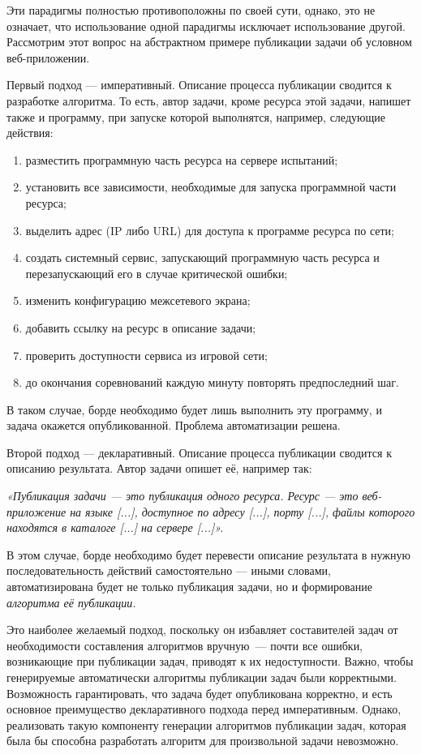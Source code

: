 Эти парадигмы полностью противоположны по своей сути, однако, это не означает, что использование одной парадигмы исключает использование другой. Рассмотрим этот вопрос на абстрактном примере публикации задачи об условном веб-приложении.

Первый подход — императивный. Описание процесса публикации сводится к разработке алгоритма. То есть, автор задачи, кроме ресурса этой задачи, напишет также и программу, при запуске которой выполнятся, например, следующие действия:

\begin{enumerate}
\label{enum:netalgo}
\item разместить программную часть ресурса на сервере испытаний;
\item установить все зависимости, необходимые для запуска программной части ресурса;
\item выделить адрес (IP либо URL) для доступа к программе ресурса по сети;
\item создать системный сервис, запускающий программную часть ресурса и перезапускающий его в случае критической ошибки;
\item изменить конфигурацию межсетевого экрана;
\item добавить ссылку на ресурс в описание задачи;
\item проверить доступности сервиса из игровой сети;
\item до окончания соревнований каждую минуту повторять предпоследний шаг.
\end{enumerate}

В таком случае, борде необходимо будет лишь выполнить эту программу, и задача окажется опубликованной. Проблема автоматизации решена.

Второй подход — декларативный. Описание процесса публикации сводится к описанию результата. Автор задачи опишет её, например так:

\textit{«Публикация задачи — это публикация одного ресурса. Ресурс — это веб-приложение на языке [...], доступное по адресу [...], порту [...], файлы которого находятся в каталоге [...] на сервере [...]».}

В этом случае, борде необходимо будет перевести описание результата в нужную последовательность действий самостоятельно — иными словами, автоматизирована будет не только публикация задачи, но и формирование \textit{алгоритма её публикации.}

Это наиболее желаемый подход, поскольку он избавляет составителей задач от необходимости составления алгоритмов вручную~--- почти все ошибки, возникающие при публикации задач, приводят к их недоступности. Важно, чтобы генерируемые автоматически алгоритмы публикации задач были корректными. Возможность гарантировать, что задача будет опубликована корректно, и есть основное преимущество декларативного подхода перед императивным. Однако, реализовать такую компоненту генерации алгоритмов публикации задач, которая была бы способна разработать алгоритм для произвольной задачи невозможно.

